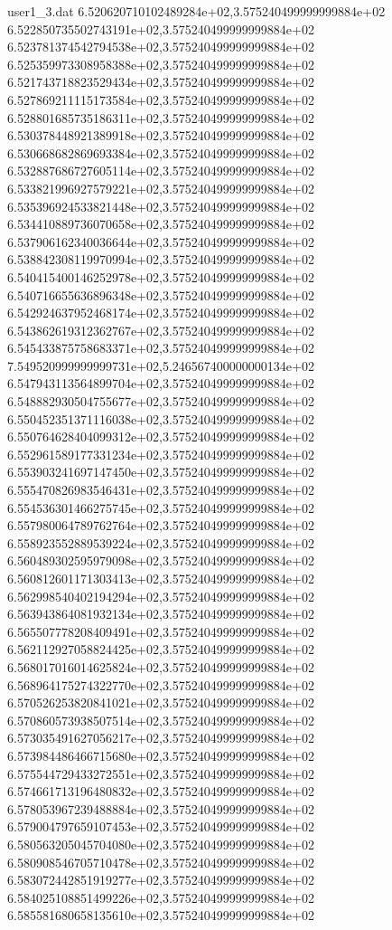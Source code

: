 \begin{filecontents}{user1_3.dat}
6.520620710102489284e+02,3.575240499999999884e+02
6.522850735502743191e+02,3.575240499999999884e+02
6.523781374542794538e+02,3.575240499999999884e+02
6.525359973308958388e+02,3.575240499999999884e+02
6.521743718823529434e+02,3.575240499999999884e+02
6.527869211115173584e+02,3.575240499999999884e+02
6.528801685735186311e+02,3.575240499999999884e+02
6.530378448921389918e+02,3.575240499999999884e+02
6.530668682869693384e+02,3.575240499999999884e+02
6.532887686727605114e+02,3.575240499999999884e+02
6.533821996927579221e+02,3.575240499999999884e+02
6.535396924533821448e+02,3.575240499999999884e+02
6.534410889736070658e+02,3.575240499999999884e+02
6.537906162340036644e+02,3.575240499999999884e+02
6.538842308119970994e+02,3.575240499999999884e+02
6.540415400146252978e+02,3.575240499999999884e+02
6.540716655636896348e+02,3.575240499999999884e+02
6.542924637952468174e+02,3.575240499999999884e+02
6.543862619312362767e+02,3.575240499999999884e+02
6.545433875758683371e+02,3.575240499999999884e+02
7.549520999999999731e+02,5.246567400000000134e+02
6.547943113564899704e+02,3.575240499999999884e+02
6.548882930504755677e+02,3.575240499999999884e+02
6.550452351371116038e+02,3.575240499999999884e+02
6.550764628404099312e+02,3.575240499999999884e+02
6.552961589177331234e+02,3.575240499999999884e+02
6.553903241697147450e+02,3.575240499999999884e+02
6.555470826983546431e+02,3.575240499999999884e+02
6.554536301466275745e+02,3.575240499999999884e+02
6.557980064789762764e+02,3.575240499999999884e+02
6.558923552889539224e+02,3.575240499999999884e+02
6.560489302595979098e+02,3.575240499999999884e+02
6.560812601171303413e+02,3.575240499999999884e+02
6.562998540402194294e+02,3.575240499999999884e+02
6.563943864081932134e+02,3.575240499999999884e+02
6.565507778208409491e+02,3.575240499999999884e+02
6.562112927058824425e+02,3.575240499999999884e+02
6.568017016014625824e+02,3.575240499999999884e+02
6.568964175274322770e+02,3.575240499999999884e+02
6.570526253820841021e+02,3.575240499999999884e+02
6.570860573938507514e+02,3.575240499999999884e+02
6.573035491627056217e+02,3.575240499999999884e+02
6.573984486466715680e+02,3.575240499999999884e+02
6.575544729433272551e+02,3.575240499999999884e+02
6.574661713196480832e+02,3.575240499999999884e+02
6.578053967239488884e+02,3.575240499999999884e+02
6.579004797659107453e+02,3.575240499999999884e+02
6.580563205045704080e+02,3.575240499999999884e+02
6.580908546705710478e+02,3.575240499999999884e+02
6.583072442851919277e+02,3.575240499999999884e+02
6.584025108851499226e+02,3.575240499999999884e+02
6.585581680658135610e+02,3.575240499999999884e+02

\end{filecontents}
